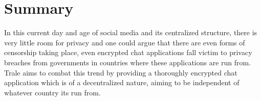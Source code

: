 \chapter{Summary}\label{ch:summary}
In this current day and age of social media and its centralized structure, there is very little room for privacy and
one could argue that there are even forms of censorship taking place, even encrypted chat applications fall victim to
privacy breaches from governments in countries where these applications are run from.
Trale aims to combat this trend by providing a thoroughly encrypted chat application which is of a decentralized
nature, aiming to be independent of whatever country its run from.
